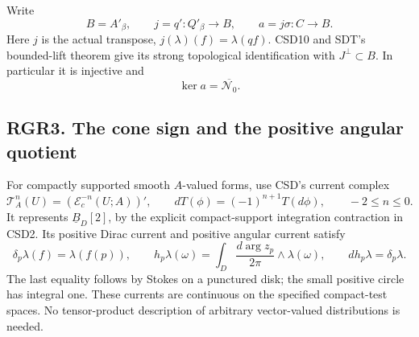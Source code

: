 Write \[
 B=A'_\beta,\qquad j=q':Q'_\beta\longrightarrow B,
 \qquad a=j\sigma:C\longrightarrow B.
 \tag{RGR2.8}
\] Here \(j\) is the actual transpose, \(j(\lambda)(f)=\lambda(qf)\).
CSD10 and SDT's bounded-lift theorem give its strong topological
identification with \(J^\perp\subset B\). In particular it is injective
and \[
 \ker a=\overline{\mathcal N_0}.
 \tag{RGR2.9}
\]

\subsection{RGR3. The cone sign and the positive angular
quotient}\label{rgr3.-the-cone-sign-and-the-positive-angular-quotient}

For compactly supported smooth \(A\)-valued forms, use CSD's current
complex \[
 \mathscr T_A^n(U)=(\mathcal E_c^{-n}(U;A))',\qquad
 dT(\phi)=(-1)^{n+1}T(d\phi),\qquad -2\le n\le0.
 \tag{RGR3.1}
\] It represents \(\underline B_D[2]\), by the explicit compact-support
integration contraction in CSD2. Its positive Dirac current and positive
angular current satisfy \[
 \delta_p\lambda(f)=\lambda(f(p)),\qquad
 h_p\lambda(\omega)=\int_D\frac{d\arg z_p}{2\pi}\wedge\lambda(\omega),
 \qquad dh_p\lambda=\delta_p\lambda.
 \tag{RGR3.2}
\] The last equality follows by Stokes on a punctured disk; the small
positive circle has integral one. These currents are continuous on the
specified compact-test spaces. No tensor-product description of
arbitrary vector-valued distributions is needed.


